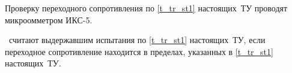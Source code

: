 Проверку переходного сопротивления по \ref{t_tr_st1} настоящих~ТУ проводят микроомметром ИКС-5.

\dut  \ считают выдержавшим испытания по \ref{t_tr_st1} настоящих~ТУ, если переходное сопротивление находится в пределах, указанных в \ref{t_tr_st1} настоящих~ТУ.

